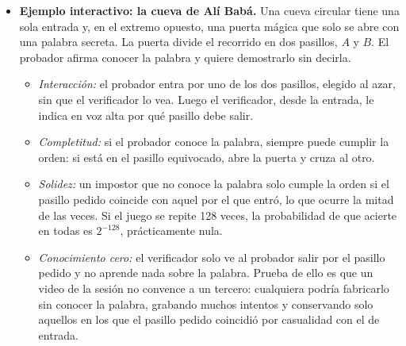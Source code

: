 \begin{itemize}
    \item \textbf{Ejemplo interactivo: la cueva de Alí Babá.}
    Una cueva circular tiene una sola entrada y, en el extremo opuesto, una puerta mágica que solo se abre con una palabra secreta. La puerta divide el recorrido en dos pasillos, $A$ y $B$. El probador afirma conocer la palabra y quiere demostrarlo sin decirla.
    \begin{itemize}
        \item \textit{Interacción:} el probador entra por uno de los dos pasillos, elegido al azar, sin que el verificador lo vea. Luego el verificador, desde la entrada, le indica en voz alta por qué pasillo debe salir.
        \item \textit{Completitud:} si el probador conoce la palabra, siempre puede cumplir la orden: si está en el pasillo equivocado, abre la puerta y cruza al otro.
        \item \textit{Solidez:} un impostor que no conoce la palabra solo cumple la orden si el pasillo pedido coincide con aquel por el que entró, lo que ocurre la mitad de las veces. Si el juego se repite 128 veces, la probabilidad de que acierte en todas es $2^{-128}$, prácticamente nula.
        \item \textit{Conocimiento cero:} el verificador solo ve al probador salir por el pasillo pedido y no aprende nada sobre la palabra. Prueba de ello es que un video de la sesión no convence a un tercero: cualquiera podría fabricarlo sin conocer la palabra, grabando muchos intentos y conservando solo aquellos en los que el pasillo pedido coincidió por casualidad con el de entrada.
    \end{itemize}


\end{itemize}
